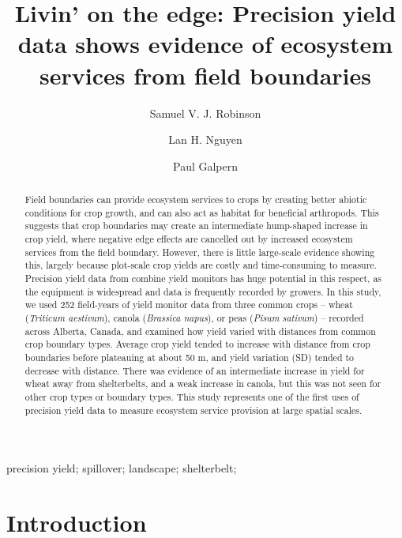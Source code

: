 \documentclass[]{elsarticle} %
\begin{document}
\begin{frontmatter}

  \title{Livin' on the edge: Precision yield data shows evidence of ecosystem services from field boundaries}
    \author[University of Calgary]{Samuel V. J. Robinson}
    \author[University of Calgary]{Lan H. Nguyen}
    \author[University of Calgary]{Paul Galpern}
      \address[University of Calgary]{2500 University Drive NW, Calgary, AB}
  
  \begin{abstract}
  Field boundaries can provide ecosystem services to crops by creating better abiotic conditions for crop growth, and can also act as habitat for beneficial arthropods. This suggests that crop boundaries may create an intermediate hump-shaped increase in crop yield, where negative edge effects are cancelled out by increased ecosystem services from the field boundary. However, there is little large-scale evidence showing this, largely because plot-scale crop yields are costly and time-consuming to measure. Precision yield data from combine yield monitors has huge potential in this respect, as the equipment is widespread and data is frequently recorded by growers. In this study, we used 252 field-years of yield monitor data from three common crops -- wheat (\emph{Triticum aestivum}), canola (\emph{Brassica napus}), or peas (\emph{Pisum sativum}) -- recorded across Alberta, Canada, and examined how yield varied with distances from common crop boundary types. Average crop yield tended to increase with distance from crop boundaries before plateauing at about 50 m, and yield variation (SD) tended to decrease with distance. There was evidence of an intermediate increase in yield for wheat away from shelterbelts, and a weak increase in canola, but this was not seen for other crop types or boundary types. This study represents one of the first uses of precision yield data to measure ecosystem service provision at large spatial scales.
  \end{abstract}
   \begin{keyword} precision yield; spillover; landscape; shelterbelt;\end{keyword}
 \end{frontmatter}

\newpage

\onehalfspacing

\hypertarget{introduction}{%
\section{Introduction}\label{introduction}}
\end{document}
